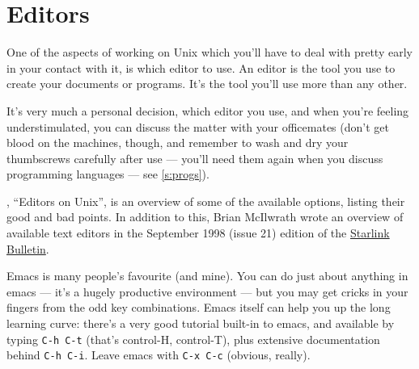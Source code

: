 \documentclass[11pt,oneside,chapters]{starlink}
\begin{document}
\section{Editors}
\label{s:editors}


One of the aspects of working on Unix which you'll have to deal with
pretty early in your contact with it, is which editor to use.  An
editor is the tool you use to create your documents or programs.  It's
the tool you'll use more than any other.

It's very much a personal decision, which editor you use, and when
you're feeling understimulated, you can discuss the matter with your
officemates (don't get blood on the machines, though, and remember to
wash and dry your thumbscrews carefully after use --- you'll need them
again when you discuss programming languages --- see
\ref{s:progs}).

, ``Editors on Unix'',
is an overview of some of the available
options, listing their good and bad points.  In addition to
this, Brian McIlwrath wrote an overview of available text
editors in the September 1998 (issue 21) edition of the
\href{http://www.starlink.ac.uk/bulletin/98sep/node15.html}{Starlink Bulletin}.

Emacs is many people's favourite (and mine).  You can do
just about anything in emacs --- it's a hugely productive
environment --- but you may get cricks in your fingers from
the odd key combinations.  Emacs itself can help you up the
long learning curve: there's a very good tutorial built-in
to emacs, and available by typing \texttt{C-h C-t}
(that's control-H, control-T), plus extensive documentation
behind \texttt{C-h C-i}.  Leave emacs with \texttt{C-x C-c}
(obvious, really).
\end{document}
